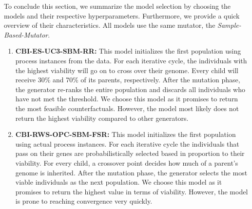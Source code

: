\documentclass[./../../paper.tex]{subfiles}
\begin{document}
To conclude this section, we summarize the model selection by choosing the models and their respective hyperparameters. Furthermore, we provide a quick overview of their characteristics. All models use the same mutator, the \emph{Sample-Based-Mutator}. 


\begin{enumerate}
    \item \textbf{CBI-ES-UC3-SBM-RR:} This model initializes the first population using process instances from the data. For each iterative cycle, the individuals with the highest viability will go on to cross over their genome. Every child will receive 30\% and 70\% of its parents, respectively. After the mutation phase, the generator re-ranks the entire population and discards all individuals who have not met the threshold. We choose this model as it promises to return the most feasible counterfactuals. However, the model most likely does not return the highest viability compared to other generators.
    \item \textbf{CBI-RWS-OPC-SBM-FSR:} This model initializes the first population using actual process instances. For each iterative cycle the individuals that pass on their genes are probabilistically selected based in proportion to their viability. For every child, a crossover point decides how much of a parent's genome is inherited. After the mutation phase, the generator selects the most viable individuals as the next population. We choose this model as it promises to return the highest value in terms of viability. However, the model is prone to reaching convergence very quickly.  
\end{enumerate}

\end{document}
